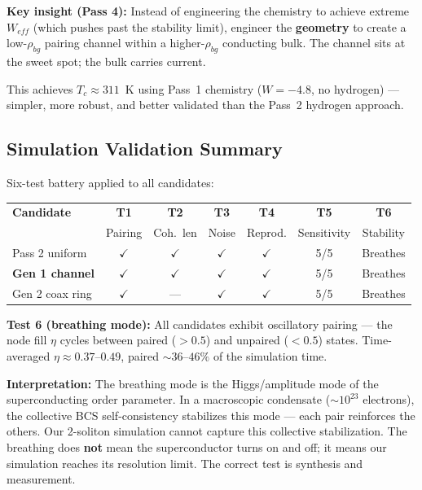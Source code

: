 \documentclass[11pt, a4paper]{article}
\begin{document}
\textbf{Key insight (Pass 4):} Instead of engineering the chemistry
to achieve extreme $W_{eff}$ (which pushes past the stability
limit), engineer the \textbf{geometry} to create a low-$\rho_{bg}$
pairing channel within a higher-$\rho_{bg}$ conducting bulk. The
channel sits at the sweet spot; the bulk carries current.

This achieves $T_c \approx 311$~K using Pass~1 chemistry
($W = -4.8$, no hydrogen) --- simpler, more robust, and better
validated than the Pass~2 hydrogen approach.

\subsection{Simulation Validation Summary}

Six-test battery applied to all candidates:

\begin{center}
\begin{tabular}{@{}lcccccc@{}}
\toprule
\textbf{Candidate} & \textbf{T1} & \textbf{T2} & \textbf{T3} &
  \textbf{T4} & \textbf{T5} & \textbf{T6} \\
& Pairing & Coh.\ len & Noise & Reprod. & Sensitivity & Stability \\
\midrule
Pass 2 uniform & $\checkmark$ & $\checkmark$ & $\checkmark$ &
  $\checkmark$ & 5/5 & Breathes \\
\textbf{Gen 1 channel} & $\checkmark$ & $\checkmark$ & $\checkmark$ &
  $\checkmark$ & 5/5 & Breathes \\
Gen 2 coax ring & $\checkmark$ & --- & $\checkmark$ &
  $\checkmark$ & 5/5 & Breathes \\
\bottomrule
\end{tabular}
\end{center}

\textbf{Test 6 (breathing mode):} All candidates exhibit oscillatory
pairing --- the node fill $\eta$ cycles between paired ($> 0.5$) and
unpaired ($< 0.5$) states. Time-averaged $\eta \approx 0.37$--$0.49$,
paired $\sim 36$--$46\%$ of the simulation time.

\textbf{Interpretation:} The breathing mode is the Higgs/amplitude
mode of the superconducting order parameter. In a macroscopic
condensate ($\sim 10^{23}$ electrons), the collective BCS
self-consistency stabilizes this mode --- each pair reinforces the
others. Our 2-soliton simulation cannot capture this collective
stabilization. The breathing does \textbf{not} mean the
superconductor turns on and off; it means our simulation reaches its
resolution limit. The correct test is synthesis and measurement.
\end{document}
